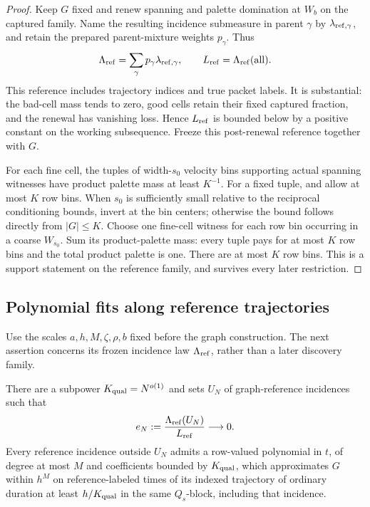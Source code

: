 \begin{proof}
Keep \(G\) fixed and renew spanning and palette domination at
\(W_b\) on the captured family. Name the resulting incidence
submeasure in parent \(\gamma\) by \(\lambda_{{\rm ref},\gamma}\),
and retain the prepared parent-mixture weights \(p_\gamma\). Thus
\begin{equation}\label{a05:graph-reference}
 \Lambda_{\rm ref}=\sum_\gamma p_\gamma
             \lambda_{{\rm ref},\gamma},\qquad
 L_{\rm ref}=\Lambda_{\rm ref}(\mathrm{all}).
\end{equation}
This reference includes trajectory indices and true packet labels.
It is substantial: the bad-cell mass tends to zero, good cells
retain their fixed captured fraction, and the renewal has vanishing
loss. Hence \(L_{\rm ref}\) is bounded below by a positive constant
on the working subsequence. Freeze this post-renewal reference
together with \(G\).

For each fine cell, the tuples of width-\(s_0\)
velocity bins supporting actual spanning witnesses have product
palette mass at least \(K^{-1}\). For a fixed tuple,
 and
 allow at most \(K\) row bins.
When \(s_0\) is sufficiently small relative to the reciprocal
conditioning bounds, invert at the bin centers; otherwise the
bound follows directly from \(|G|\leq K\).
Choose one fine-cell witness for each row bin occurring in a
coarse \(W_{s_0}\). Sum its product-palette mass: every tuple pays
for at most \(K\) row bins and the total product palette is one.
There are at most \(K\) row bins. This is a support statement on
the reference family, and survives every later restriction.
\end{proof}

\subsection{Polynomial fits along reference trajectories}

Use the scales \(a,h,M,\zeta,\rho,b\) fixed before the graph
construction. The next assertion concerns its frozen incidence
law \(\Lambda_{\rm ref}\), rather than a later discovery family.

\begin{proposition}\label{a05:qualification}
There are a subpower \(K_{\rm qual}=N^{o(1)}\) and sets \(U_N\) of
graph-reference incidences such that
\begin{equation}\label{a05:qualification-exception}
 e_N:=\frac{\Lambda_{\rm ref}(U_N)}{L_{\rm ref}}
       \longrightarrow0.
\end{equation}
Every reference incidence outside \(U_N\) admits a row-valued
polynomial in \(t\), of degree at most \(M\) and coefficients
bounded by \(K_{\rm qual}\), which approximates \(G\) within
\(h^M\) on reference-labeled times of its indexed trajectory of
ordinary duration at least \(h/K_{\rm qual}\) in the same
\(Q_s\)-block, including that incidence.
\end{proposition}


